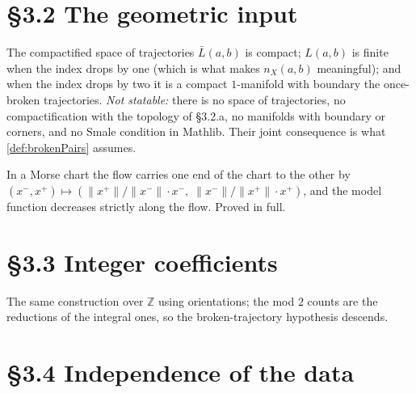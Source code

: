 \section{\S3.2 The geometric input}

\begin{theorem}
  \label{thm:3.2}
  \notready
  The compactified space of trajectories $\bar L(a,b)$ is compact; $L(a,b)$ is
  finite when the index drops by one (which is what makes $n_X(a,b)$ meaningful);
  and when the index drops by two it is a compact $1$-manifold with boundary the
  once-broken trajectories.
  \emph{Not statable:} there is no space of trajectories, no compactification
  with the topology of \S3.2.a, no manifolds with boundary or corners, and no
  Smale condition in Mathlib.  Their joint consequence is what
  \ref{def:brokenPairs} assumes.
\end{theorem}

\begin{lemma}
  \label{lem:3.2.11}
  \leanok
  In a Morse chart the flow carries one end of the chart to the other by
  $(x^-,x^+) \mapsto (\lVert x^+\rVert/\lVert x^-\rVert\cdot x^-,\;
  \lVert x^-\rVert/\lVert x^+\rVert\cdot x^+)$, and the model function decreases
  strictly along the flow.  Proved in full.
\end{lemma}

\section{\S3.3 Integer coefficients}

\begin{proposition}
  \label{prop:3.3}
  \leanok
  The same construction over $\mathbb{Z}$ using orientations; the mod $2$ counts
  are the reductions of the integral ones, so the broken-trajectory hypothesis
  descends.
\end{proposition}

\section{\S3.4 Independence of the data}

